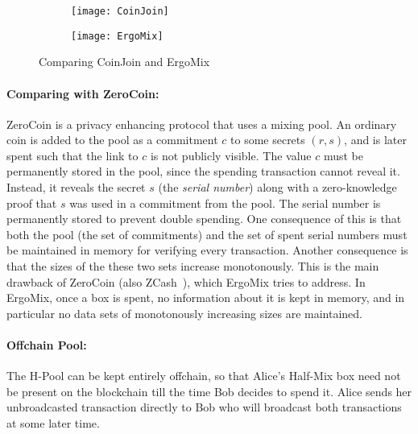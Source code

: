 \documentclass[11pt]{article}
\newcommand{\mixname}{ErgoMix\xspace}
\begin{document}
\begin{figure}
	\centering
	\begin{subfigure}{.5\textwidth}
		\centering
		\texttt{[image: CoinJoin]}
		\label{fig:coinjoin}
	\end{subfigure}%
	\begin{subfigure}{.5\textwidth}
		\centering
		\texttt{[image: ErgoMix]}
		\captionof{figure}{\mixname}
		\label{fig:mixname}
	\end{subfigure}
	\caption{Comparing CoinJoin and \mixname}
	\label{fig:comparecoinjoin}
\end{figure}

\paragraph{Comparing with ZeroCoin:} ZeroCoin is a privacy enhancing protocol that uses a mixing pool. An ordinary coin is added to the pool as a commitment $c$ to some secrets $(r, s)$, and is later spent such that the link to $c$ is not publicly visible. The value $c$ must be permanently stored in the pool, since the spending transaction cannot reveal it. Instead, it reveals the secret $s$ (the {\em serial number}) along with a zero-knowledge proof that $s$ was used in a commitment from the pool. The serial number is permanently stored to prevent double spending. One consequence of this is that both the pool (the set of commitments) and the set of spent serial numbers must be maintained in memory for verifying every transaction. Another consequence is that the sizes of the these two sets increase monotonously.
This is the main drawback of ZeroCoin (also ZCash~\cite{zcash}), which \mixname tries to address. 
In \mixname, once a box is spent, no information about it is kept in memory, and in particular no data sets of monotonously increasing sizes are maintained. 


\paragraph{Offchain Pool:} The H-Pool can be kept entirely offchain, so that Alice's Half-Mix box need not be present on the blockchain till the time Bob decides to spend it. Alice sends her unbroadcasted transaction directly to Bob who will broadcast both transactions at some later time. 
\end{document}
